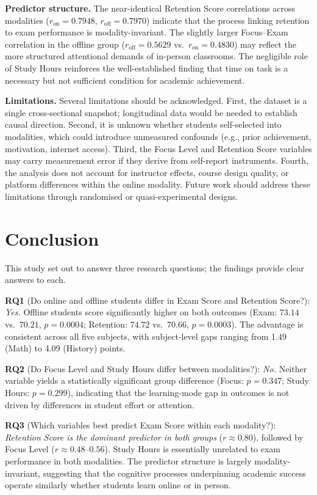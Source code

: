 \documentclass[11pt]{article}
\begin{document}
\textbf{Predictor structure.}
The near-identical Retention Score correlations across modalities
($r_{\text{on}} = 0.7948$, $r_{\text{off}} = 0.7970$) indicate that the
process linking retention to exam performance is modality-invariant.
The slightly larger Focus--Exam correlation in the offline group
($r_{\text{off}} = 0.5629$ vs.\ $r_{\text{on}} = 0.4830$) may reflect the
more structured attentional demands of in-person classrooms.
The negligible role of Study Hours reinforces the well-established finding that
time on task is a necessary but not sufficient condition for academic achievement.

\textbf{Limitations.}
Several limitations should be acknowledged.
First, the dataset is a single cross-sectional snapshot; longitudinal data would
be needed to establish causal direction.
Second, it is unknown whether students self-selected into modalities, which could
introduce unmeasured confounds (e.g., prior achievement, motivation, internet
access).
Third, the Focus Level and Retention Score variables may carry measurement error
if they derive from self-report instruments.
Fourth, the analysis does not account for instructor effects, course design quality,
or platform differences within the online modality.
Future work should address these limitations through randomised or quasi-experimental
designs.

\section{Conclusion}

This study set out to answer three research questions; the findings provide clear
answers to each.

\textbf{RQ1} (Do online and offline students differ in Exam Score and Retention
Score?): \textit{Yes.}
Offline students score significantly higher on both outcomes
(Exam: $73.14$ vs.\ $70.21$, $p = 0.0004$;
Retention: $74.72$ vs.\ $70.66$, $p = 0.0003$).
The advantage is consistent across all five subjects, with subject-level gaps
ranging from 1.49 (Math) to 4.09 (History) points.

\textbf{RQ2} (Do Focus Level and Study Hours differ between modalities?):
\textit{No.}
Neither variable yields a statistically significant group difference
(Focus: $p = 0.347$; Study Hours: $p = 0.299$),
indicating that the learning-mode gap in outcomes is not driven by differences
in student effort or attention.

\textbf{RQ3} (Which variables best predict Exam Score within each modality?):
\textit{Retention Score is the dominant predictor in both groups} ($r \approx 0.80$),
followed by Focus Level ($r \approx 0.48$--$0.56$).
Study Hours is essentially unrelated to exam performance in both modalities.
The predictor structure is largely modality-invariant, suggesting that the
cognitive processes underpinning academic success operate similarly whether
students learn online or in person.
\end{document}
